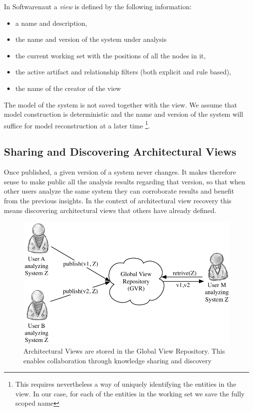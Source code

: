 \documentclass[preprint,12pt]{elsarticle}
\begin{document}
In Softwarenaut a {\em view} is defined by the following information: 

\begin{itemize}
\item a name and description,
\item the name and version of the system under analysis
\item the current working set with the positions of all the nodes in it,
\item the active artifact and relationship filters (both explicit and rule based), 
\item the name of the creator of the view
\end{itemize}

The model of the system is not saved together with the view. We assume that model construction is deterministic and the name and version of the system will suffice for model reconstruction at a later time \footnote{This requires nevertheless a way of uniquely identifying the entities in the view. In our case, for each of the entities in the working set we save the fully scoped name}.

\subsection {Sharing and Discovering Architectural Views}

Once published, a given version of a system never changes. It makes therefore sense to make public all the analysis results regarding that version, so that when other users analyze the same system they can corroborate results and benefit from the previous insights. In the context of architectural view recovery this means discovering architectural views that others have already defined. 

\begin{figure}[ht]
\begin{center}
\includegraphics[width=0.7\linewidth]{images/CollaborationConcept}
\caption{Architectural Views are stored in the Global View Repository. This enables collaboration through knowledge sharing and discovery}
\end{center}
\end{figure}
\end{document}
